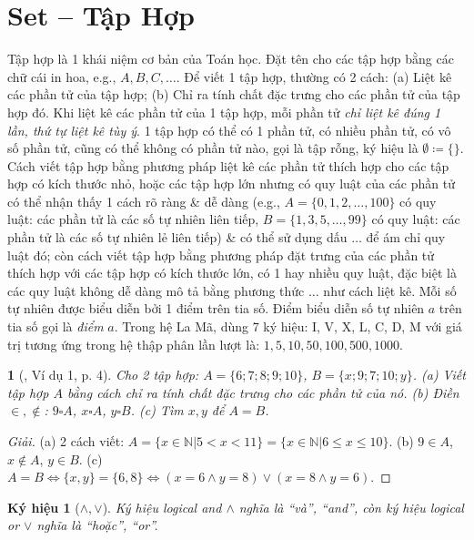 \documentclass{article}
\newtheorem{baitoan}{}
\newtheorem{kyhieu}{Ký hiệu}
\begin{document}
\section{Set -- Tập Hợp}
 Tập hợp là 1 khái niệm cơ bản của Toán học. Đặt tên cho các tập hợp bằng các chữ cái in hoa, e.g., $A,B,C,\ldots$.  Để viết 1 tập hợp, thường có 2 cách: (a) Liệt kê các phần tử của tập hợp; (b) Chỉ ra tính chất đặc trưng cho các phần tử của tập hợp đó.  Khi liệt kê các phần tử của 1 tập hợp, mỗi phần tử \textit{chỉ liệt kê đúng 1 lần, thứ tự liệt kê tùy ý}.  1 tập hợp có thể có 1 phần tử, có nhiều phần tử, có vô số phần tử, cũng có thể không có phần tử nào, gọi là tập rỗng, ký hiệu là $\emptyset\coloneqq\{\}$.  Cách viết tập hợp bằng phương pháp liệt kê các phần tử thích hợp cho các tập hợp có kích thước nhỏ, hoặc các tập hợp lớn nhưng có quy luật của các phần tử có thể nhận thấy 1 cách rõ ràng \& dễ dàng (e.g., $A = \{0,1,2,\ldots,100\}$ có quy luật: các phần tử là các số tự nhiên liên tiếp, $B = \{1,3,5,\ldots,99\}$ có quy luật: các phần tử là các số tự nhiên lẻ liên tiếp) \& có thể sử dụng dấu $\ldots$ để ám chỉ quy luật đó; còn cách viết tập hợp bằng phương pháp đặt trưng của các phần tử thích hợp với các tập hợp có kích thước lớn, có 1 hay nhiều quy luật, đặc biệt là các quy luật không dễ dàng mô tả bằng phương thức $\ldots$ như cách liệt kê.  Mỗi số tự nhiên được biểu diễn bởi 1 điểm trên tia số. Điểm biểu diễn số tự nhiên $a$ trên tia số gọi là \textit{điểm} $a$.  Trong hệ La Mã, dùng 7 ký hiệu: I, V, X, L, C, D, M với giá trị tương ứng trong hệ thập phân lần lượt là: $1,5,10,50,100,500,1000$.

\begin{baitoan}[\cite{Tuyen_Toan_6}, Ví dụ 1, p. 4]
	Cho 2 tập hợp: $A = \{6;7;8;9;10\}$, $B = \{x;9;7;10;y\}$. (a) Viết tập hợp $A$ bằng cách chỉ ra tính chất đặc trưng cho các phần tử của nó. (b) Điền $\in,\notin$: $9\square A$, $x\square A$, $y\square B$. (c) Tìm $x,y$ để $A = B$.
\end{baitoan}

\begin{proof}[Giải]
	(a) 2 cách viết: $A = \{x\in\mathbb{N}|5 < x < 11\} = \{x\in\mathbb{N}|6\le x\le10\}$. (b) $9\in A$, $x\notin A$, $y\in B$. (c) $A = B\Leftrightarrow\{x,y\} = \{6,8\}\Leftrightarrow(x = 6\land y = 8)\lor(x = 8\land y = 6)$.
\end{proof}

\begin{kyhieu}[$\land,\lor$]
	Ký hiệu logical and $\land$ nghĩa là ``và'', ``and'', còn ký hiệu logical or $\lor$ nghĩa là ``hoặc'', ``or''.
\end{kyhieu}
\end{document}
